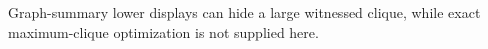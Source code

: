 Graph-summary lower displays can hide a large witnessed clique, while exact maximum-clique optimization is not supplied here.